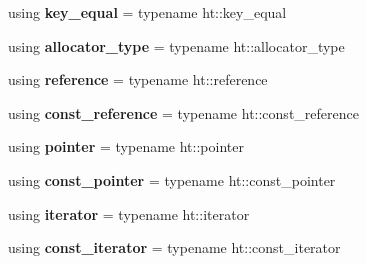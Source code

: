 \begin{DoxyCompactItemize}
using {\bfseries key\+\_\+equal} = typename ht\+::key\+\_\+equal
\item 
\mbox{\label{classtsl_1_1robin__map_a37f47824e4d915497871a4c390545832}} 
using {\bfseries allocator\+\_\+type} = typename ht\+::allocator\+\_\+type
\item 
\mbox{\label{classtsl_1_1robin__map_a04a16c9f6b0b693f80c3c3b4e88bf84d}} 
using {\bfseries reference} = typename ht\+::reference
\item 
\mbox{\label{classtsl_1_1robin__map_a8ecb3cf83ea0185f9c0cc8ceb9beb2e5}} 
using {\bfseries const\+\_\+reference} = typename ht\+::const\+\_\+reference
\item 
\mbox{\label{classtsl_1_1robin__map_a3cce1b7d31889ec3843291a4687314c8}} 
using {\bfseries pointer} = typename ht\+::pointer
\item 
\mbox{\label{classtsl_1_1robin__map_a0d430390641c33d9d664a9436cb8e6e3}} 
using {\bfseries const\+\_\+pointer} = typename ht\+::const\+\_\+pointer
\item 
\mbox{\label{classtsl_1_1robin__map_afcded2ad86ebfdb7e1e9b252866215d8}} 
using {\bfseries iterator} = typename ht\+::iterator
\item 
\mbox{\label{classtsl_1_1robin__map_aaa64e5b935fdeea46e58cf369bd957b1}} 
using {\bfseries const\+\_\+iterator} = typename ht\+::const\+\_\+iterator
\end{DoxyCompactItemize}
